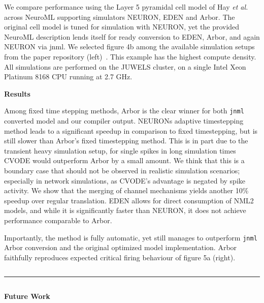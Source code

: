 \documentclass{beamer}
\begin{document}
\begin{frame}[t, fragile]
\begin{columns}
\begin{column}{0.73\textwidth}
\begin{columns}[t]
\begin{column}[t]{0.53\textwidth}
          We compare performance using the Layer 5 pyramidal cell model of Hay
          \emph{et al.} across NeuroML supporting simulators NEURON, EDEN and Arbor.
          The original cell model is tuned for simulation with NEURON, yet the
          provided NeuroML description lends itself for ready conversion to EDEN,
          Arbor, and again NEURON via jnml. We selected figure 4b among the
          available simulation setups from the paper repository (left)~\cite{HayNML}. This
          example has the highest compute density. All simulations are
          performed on the JUWELS cluster, on a single Intel Xeon Platinum 8168 CPU
          running at 2.7 GHz.

          \textbf{Results}

          Among fixed time stepping methods, Arbor is the clear winner for both
          \texttt{jnml} converted model and our \nmlcc{} compiler output.
          NEURONs adaptive timestepping method leads to a significant speedup in
          comparison to fixed timestepping, but is still slower than Arbor's
          fixed timestepping method. This is in part due to the transient heavy
          simulation setup, for single spikes in long simulation times CVODE
          would outperform Arbor by a small amount. We think that this is a
          boundary case that should not be observed in realistic simulation
          scenarios; especially in network simulations, as CVODE's advantage is
          negated by spike activity. We show that the merging of channel
          mechanisms yields another 10\% speedup over regular translation. EDEN
          allows for direct consumption of NML2 models, and while it is
          significantly faster than NEURON, it does not achieve performance
          comparable to Arbor.

          Importantly, the \nmlcc{} method is fully automatic, yet still manages to
          outperform \texttt{jnml} Arbor conversion and the original optimized model
          implementation. Arbor \nmlcc{} faithfully reproduces expected critical firing
          behaviour of figure 5a (right).
        \end{column}
      \end{columns}
      \vspace*{1ex}
      \textcolor{arbred}{\rule{\textwidth}{0.59ex}}
      \vspace*{-1ex}
      \begin{columns}[t]
        \begin{column}[t]{0.49\textwidth}
          \textbf{Future Work}


\end{column}
\end{columns}
\end{column}
\end{columns}
\end{frame}
\end{document}
